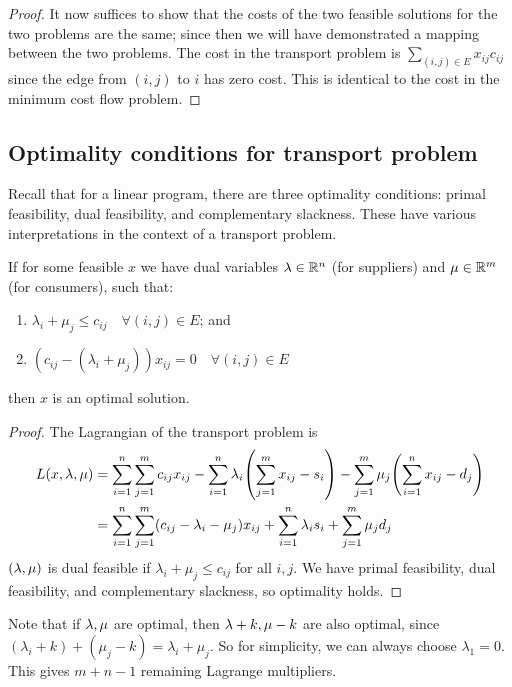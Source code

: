 \begin{proof}
	\medskip\noindent It now suffices to show that the costs of the two feasible solutions for the two problems are the same; since then we will have demonstrated a mapping between the two problems.
	The cost in the transport problem is \( \sum_{(i,j) \in E} x_{ij} c_{ij} \) since the edge from \( (i,j) \) to \( i \) has zero cost.
	This is identical to the cost in the minimum cost flow problem.
\end{proof}

\subsection{Optimality conditions for transport problem}
Recall that for a linear program, there are three optimality conditions: primal feasibility, dual feasibility, and complementary slackness.
These have various interpretations in the context of a transport problem.
\begin{theorem}
	If for some feasible \( x \) we have dual variables \( \vb \lambda \in \mathbb R^n \) (for suppliers) and \( \vb \mu \in \mathbb R^m \) (for consumers), such that:
	\begin{enumerate}
		\item \( \lambda_i + \mu_j \leq c_{ij} \quad \forall (i,j) \in E \); and
		\item \( (c_{ij} - (\lambda_i + \mu_j)) x_{ij} = 0 \quad \forall (i,j) \in E \)
	\end{enumerate}
	then \( x \) is an optimal solution.
\end{theorem}
\begin{proof}
	The Lagrangian of the transport problem is
	\begin{align*}
		L(x,\vb \lambda,\vb \mu) & = \sum_{i=1}^n \sum_{j=1}^m c_{ij}x_{ij} - \sum_{i=1}^n \lambda_i \qty(\sum_{j=1}^m x_{ij} - s_i) - \sum_{j=1}^m \mu_j \qty(\sum_{i=1}^n x_{ij} - d_j) \\
		                         & = \sum_{i=1}^n \sum_{j=1}^m (c_{ij} - \lambda_i - \mu_j) x_{ij} + \sum_{i=1}^n \lambda_i s_i + \sum_{j=1}^m \mu_j d_j
	\end{align*}
	\( (\vb \lambda, \vb \mu) \) is dual feasible if \( \lambda_i + \mu_j \leq c_{ij} \) for all \( i,j \).
	We have primal feasibility, dual feasibility, and complementary slackness, so optimality holds.
\end{proof}
Note that if \( \vb\lambda, \vb\mu \) are optimal, then \( \vb\lambda + k, \vb\mu - k \) are also optimal, since \( (\lambda_i + k) + (\mu_j - k) = \lambda_i + \mu_j \).
So for simplicity, we can always choose \( \lambda_1 = 0 \).
This gives \( m + n - 1 \) remaining Lagrange multipliers.
